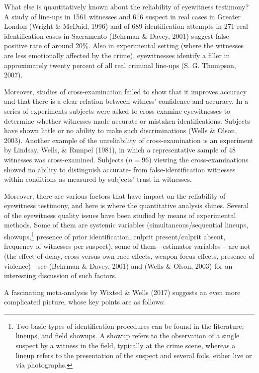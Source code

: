 \documentclass[
  10pt,
  dvipsnames,enabledeprecatedfontcommands]{scrartcl}
\begin{document}
What else is quantitatively known about the reliability of eyewitness
testimony? A study of line-ups in 1561 witnesses and 616 suspect in real
cases in Greater London (Wright \& McDaid, 1996) and of 689
identification attempts in 271 real identification cases in Sacramento
(Behrman \& Davey, 2001) suggest false positive rate of around 20\%.
Also in experimental setting (where the witnesses are less emotionally
affected by the crime), eyewitnesses identify a filler in approximately
twenty percent of all real criminal line-ups (S. G. Thompson, 2007).

Moreover, studies of cross-examination failed to show that it improves
accuracy and that there is a clear relation between witness' confidence
and accuracy. In a series of experiments subjects were asked to
cross-examine eyewitnesses to determine whether witnesses made accurate
or mistaken identifications. Subjects have shown little or no ability to
make such discriminations (Wells \& Olson, 2003). Another example of the
unreliability of cross-examination is an experiment by Lindsay, Wells,
\& Rumpel (1981), in which a representative sample of \(48\) witnesses
was cross-examined. Subjects (\(n = 96\)) viewing the cross-examinations
showed no ability to distinguish accurate- from false-identification
witnesses within conditions as measured by subjects' trust in witnesses.

Moreover, there are various factors that have impact on the reliability
of eyewitness testimony, and here is where the quantitative analysis
shines. Several of the eyewitness quality issues have been studied by
means of experimental methods. Some of them are systemic variables
(simultaneous/sequential lineups,
showups,\footnote{Two basic types of identification procedures can be found in the literature, lineups, and field showups. A showup refers to the observation of a single suspect by a witness in the field, typically at the crime scene, whereas a lineup refers to the presentation of the suspect and several foils, either live or via photographs.}
presence of prior identification, culprit present/culprit absent,
frequency of witnesses per suspect), some of them---estimator variables
-- are not (the effect of delay, cross versus own-race effects, weapon
focus effects, presence of violence)---see (Behrman \& Davey, 2001) and
(Wells \& Olson, 2003) for an interesting discussion of such factors.

A fascinating meta-analysis by Wixted \& Wells (2017) suggests an even
more complicated picture, whose key points are as follows:
\end{document}

